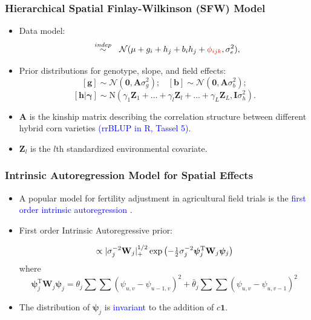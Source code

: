 \documentclass{beamer}
\newcommand{\bA}{\mathbf{A}}
\newcommand{\bphi}{{\bm\phi}}
\newcommand{\bpsi}{{\bm\psi}}
\newcommand{\bW}{\mathbf{W}}
\newcommand{\sT}{\mathrm{T}}
\newcommand{\bZ}{\mathbf{Z}}
\newcommand{\shalf}{\mbox{{\footnotesize$\frac{1}{2}$}}}
\newcommand{\red}[1]{\textcolor{red}{#1}}
\begin{document}
\begin{frame}
	\frametitle{Hierarchical Spatial Finlay-Wilkinson (SFW) Model}
	\begin{itemize}
	\item Data model:
\begin{equation*}
[y_{ijk} | \mu, \mathbf{g}, \mathbf{b}, \mathbf{h}, \red{\bphi} ] \ \ \overset{indep}{\sim} \ \  \mathcal{N}(\mu + g_i + h_j + b_i h_j + \red{\phi_{ijk}}, \sigma_e^2),
\end{equation*}

	\item Prior distributions for genotype, slope, and field effects:
	$$  [\mathbf{g}] \sim \mathcal{N}(\bm{0}, \bA \sigma_g^2); \ \ \ \ [\mathbf{b}] \sim \mathcal{N}(\bm{0}, \bA \sigma_b^2); $$
        $$[\mathbf{h}|\bm{\gamma}] \sim \mathrm{N}( \gamma_1 \bZ_1 + \dots + \gamma_l \bZ_l + \dots + \gamma_L \bZ_L
         , \mathbf{I} \sigma_h^2).$$
         \item $\bA$ is the kinship matrix describing the correlation structure between different hybrid corn varieties \textcolor{blue}{(rrBLUP in R, Tassel 5)}.
	\item $\bZ_{l}$ is the $l$th standardized environmental covariate.
	\end{itemize}
\end{frame}


\begin{frame}
	\frametitle{Intrinsic Autoregression Model for Spatial Effects}
	\begin{itemize}
	\item A popular model for fertility adjustment in agricultural field trials is the \textcolor{blue}{first order intrinsic autoregression} \citep{besag1999bayesian,dutt:mond:2015}.

\item First order Intrinsic Autoregressive prior:

\begin{equation*}
[\bpsi_j|\theta_j,\sigma^2_j] \propto |\sigma^{-2}_j\bW_j|_+^{1/2}\exp\left( -\shalf\sigma^{-2}_j\bpsi_j^\sT \bW_j\bpsi_j\right)
\end{equation*}
where
\[\bpsi_j^\sT \bW_j\bpsi_j = \theta_j\sum\sum(\psi_{u,v} - \psi_{u-1,v})^2 + {\bar\theta}_j\sum\sum(\psi_{u,v} - \psi_{u,v-1})^2\]

\item  The distribution of $\pmb{\psi}_j$ is \textcolor{blue}{invariant} to the addition of $c \bm{1}$.

	\end{itemize}

\end{frame}
\end{document}
